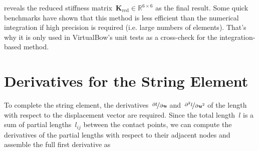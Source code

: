 reveals the reduced stiffness matrix~$\boldsymbol{K}_{\mathrm{red}} \in \mathbb{R}^{6 \times 6}$ as the final result.
Some quick benchmarks have shown that this method is less efficient than the numerical integration if high precision is required (i.e. large numbers of elements).
That's why it is only used in VirtualBow's unit tests as a cross-check for the integration-based method.

\newpage
\section{Derivatives for the String Element}
\label{sec:derivatives-for-the-string-element}

To complete the string element, the derivatives~$\nicefrac{\partial l}{\partial \boldsymbol{u}}$ and~$\nicefrac{\partial^2 l}{\partial \boldsymbol{u}^2}$ of the length with respect to the displacement vector are required.
Since the total length~$l$ is a sum of partial lengths~$l_{ij}$ between the contact points, we can compute the derivatives of the partial lengths with respect to their adjacent nodes and assemble the full first derivative as

